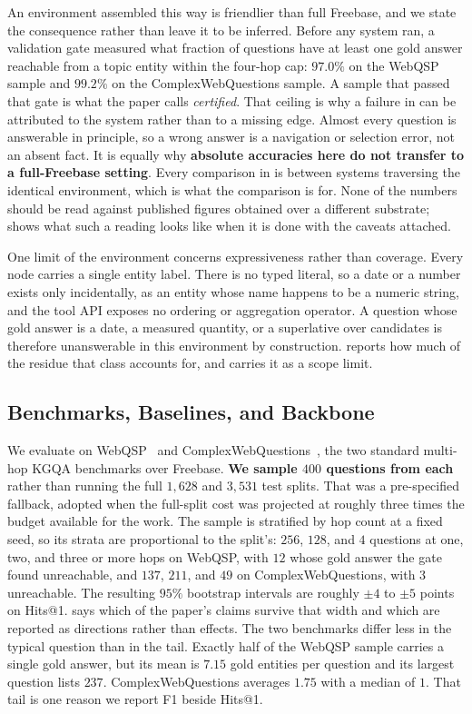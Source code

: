An environment assembled this way is friendlier than full Freebase, and
we state the consequence rather than leave it to be inferred. Before any
system ran, a validation gate measured what fraction of questions have
at least one gold answer reachable from a topic entity within the
four-hop cap: $97.0\%$ on the WebQSP sample and $99.2\%$ on the
ComplexWebQuestions sample. A sample that passed that gate is what the
paper calls \emph{certified}. That ceiling is why a failure in
 can be attributed to the system rather than to
a missing edge. Almost every question is answerable in principle, so a
wrong answer is a navigation or selection error, not an absent fact. It
is equally why \textbf{absolute accuracies here do not transfer to a
full-Freebase setting}. Every comparison in  is
between systems traversing the identical environment, which is what the
comparison is for. None of the numbers should be read against published
figures obtained over a different substrate;  shows what
such a reading looks like when it is done with the caveats attached.

One limit of the environment concerns expressiveness rather than
coverage. Every node carries a single entity label. There is no typed
literal, so a date or a number exists only incidentally, as an entity
whose name happens to be a numeric string, and the tool API exposes no
ordering or aggregation operator. A question whose gold answer is a
date, a measured quantity, or a superlative over candidates is therefore
unanswerable in this environment by construction.
 reports how much of the residue that class
accounts for, and  carries it as a scope limit.

\subsection{Benchmarks, Baselines, and Backbone}\label{sec:baselines}

We evaluate on WebQSP~\cite{yih2016value} and
ComplexWebQuestions~\cite{talmor2018web}, the two standard multi-hop
KGQA benchmarks over Freebase. \textbf{We sample $400$ questions from
each} rather than running the full $1{,}628$ and $3{,}531$ test splits.
That was a pre-specified fallback, adopted when the full-split cost was
projected at roughly three times the budget available for the work. The
sample is stratified by hop count at a fixed seed, so its strata are
proportional to the split's: $256$, $128$, and $4$ questions at one,
two, and three or more hops on WebQSP, with $12$ whose gold answer the
gate found unreachable, and $137$, $211$, and $49$ on
ComplexWebQuestions, with $3$ unreachable. The resulting $95\%$
bootstrap intervals are roughly $\pm4$ to $\pm5$ points on Hits@1.
 says which of the paper's claims survive that
width and which are reported as directions rather than effects. The two
benchmarks differ less in the typical question than in the tail. Exactly
half of the WebQSP sample carries a single gold answer, but its mean is
$7.15$ gold entities per question and its largest question lists $237$.
ComplexWebQuestions averages $1.75$ with a median of $1$. That tail is
one reason we report F1 beside Hits@1.

